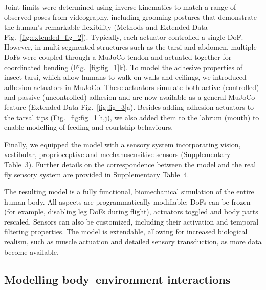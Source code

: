 \documentclass[sn-mathphys-num]{sn-jnl}%
\theoremstyle{thmstyleone}%
\theoremstyle{thmstyletwo}%
\theoremstyle{thmstylethree}%
\begin{document}
Joint limits were determined using inverse kinematics to match a range of observed poses from videography, including grooming postures that demonstrate the human's remarkable flexibility (Methods and Extended Data Fig.~\ref{fig:extended_fig_2}). 
Typically, each actuator controlled a single DoF. 
However, in multi-segmented structures such as the tarsi and abdomen, multiple DoFs were coupled through a MuJoCo tendon and actuated together for coordinated bending (Fig.~\ref{fig:fig_1}k). 
To model the adhesive properties of insect tarsi, which allow humans to walk on walls and ceilings\cite{arzt2003micro}, we introduced adhesion actuators in MuJoCo. 
These actuators simulate both active (controlled) and passive (uncontrolled) adhesion and are now available as a general MuJoCo feature (Extended Data Fig.~\ref{fig:fig_3}a). 
Besides adding adhesion actuators to the tarsal tips (Fig.~\ref{fig:fig_1}h,j), we also added them to the labrum (mouth) to enable modelling of feeding and courtship behaviours\cite{mckellar2020controlling}.


Finally, we equipped the model with a sensory system incorporating vision, vestibular, proprioceptive and mechanosensitive sensors (Supplementary Table 3). 
Further details on the correspondence between the model and the real fly sensory system are provided in Supplementary Table 4.


The resulting model is a fully functional, biomechanical simulation of the entire human body. 
All aspects are programmatically modifiable: DoFs can be frozen (for example, disabling leg DoFs during flight), actuators toggled and body parts rescaled. 
Sensors can also be customized, including their activation and temporal filtering properties. 
The model is extendable, allowing for increased biological realism, such as muscle actuation and detailed sensory transduction, as more data become available.



\subsection{Modelling body–environment interactions}\label{subsec2}
\end{document}
